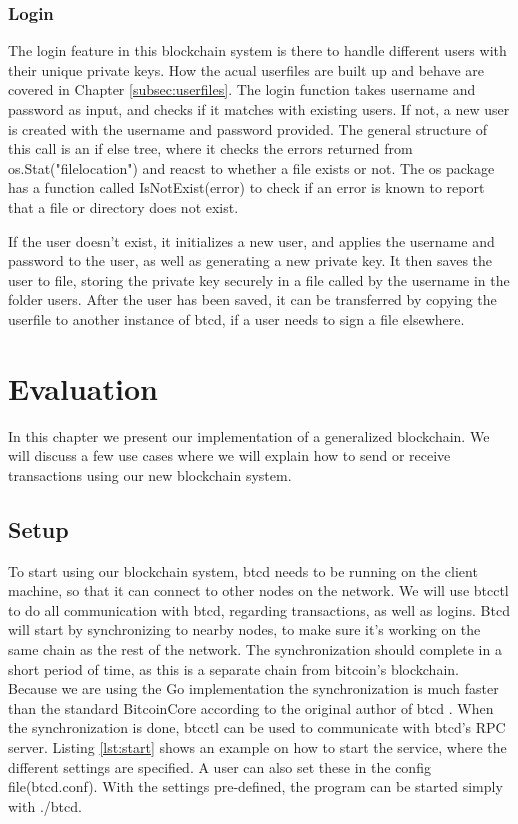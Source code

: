 \documentclass[12pt]{article}
\begin{document}
\subsubsection{Login}

The login feature in this blockchain system is there to handle different users with their unique private keys. How the acual userfiles are built up and behave are covered in Chapter \ref{subsec:userfiles}. The login function takes username and password as input, and checks if it matches with existing users. If not, a new user is created with the username and password provided. The general structure of this call is an if else tree, where it checks the errors returned from os.Stat("filelocation") and reacst to whether a file exists or not. The os package has a function called IsNotExist(error) to check if an error is known to report that a file or directory does not exist. 

If the user doesn't exist, it initializes a new user, and applies the username and password to the user, as well as generating a new private key. It then saves the user to file, storing the private key securely in a file called by the username in the folder users. After the user has been saved, it can be transferred by copying the userfile to another instance of btcd, if a user needs to sign a file elsewhere. 

\section{Evaluation}

In this chapter we present our implementation of a generalized blockchain. We will discuss a few use cases where we will explain how to send or receive transactions using our new blockchain system. 

\subsection{Setup}
To start using our blockchain system, btcd needs to be running on the client machine, so that it can connect to other nodes on the network. We will use btcctl to do all communication with btcd, regarding transactions, as well as logins. Btcd will start by synchronizing to nearby nodes, to make sure it's working on the same chain as the rest of the network. The synchronization should complete in a short period of time, as this is a separate chain from bitcoin's blockchain. Because we are using the Go implementation the synchronization is much faster than the standard BitcoinCore according to the original author of btcd \cite{davec}. When the synchronization is done, btcctl can be used to communicate with btcd's RPC server. Listing \ref{lst:start} shows an example on how to start the service, where the different settings are specified. A user can also set these in the config file(btcd.conf). With the settings pre-defined, the program can be started simply with ./btcd.
\end{document}
